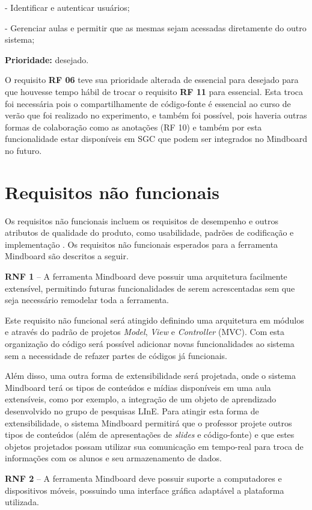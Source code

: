 - Identificar e autenticar usuários;

- Gerenciar aulas e permitir que as mesmas sejam acessadas diretamente do outro sistema;

\textbf{Prioridade:} desejado.

O requisito \textbf{RF 06} teve sua prioridade alterada de essencial para desejado para que houvesse tempo hábil de trocar o requisito \textbf{RF 11} para essencial. Esta troca foi necessária pois o compartilhamente de código-fonte é essencial ao curso de verão que foi realizado no experimento, e também foi possível, pois haveria outras formas de colaboração como as anotações (RF 10)  e também por esta funcionalidade estar disponíveis em SGC que podem ser integrados no Mindboard no futuro.

\section{Requisitos não funcionais}

Os requisitos não funcionais incluem os requisitos de desempenho e outros atributos de qualidade do produto, como usabilidade, padrões de codificação e implementação \cite{padua05}. Os requisitos não funcionais esperados para a ferramenta Mindboard são descritos a seguir.

\textbf{RNF 1} – A ferramenta Mindboard deve possuir uma arquitetura facilmente extensível, permitindo futuras funcionalidades de serem acrescentadas sem que seja necessário remodelar toda a ferramenta.

Este requisito não funcional será atingido definindo uma arquitetura em módulos e através do padrão de projetos \emph{Model}, \emph{View} e \emph{Controller} (MVC). Com esta organização do código será possível adicionar novas funcionalidades ao sistema sem a necessidade de refazer partes de códigos já funcionais.

Além disso, uma outra forma de extensibilidade será projetada, onde o sistema Mindboard terá os tipos de conteúdos e mídias disponíveis em uma aula extensíveis, como por exemplo, a integração de um objeto de aprendizado desenvolvido no grupo de pesquisas LInE. Para atingir esta forma de extensibilidade, o sistema Mindboard permitirá que o professor projete outros tipos de conteúdos (além de apresentações de \emph{slides} e código-fonte) e que estes objetos projetados possam utilizar sua comunicação em tempo-real para troca de informações com os alunos e seu armazenamento de dados.  


\textbf{RNF 2} – A ferramenta Mindboard deve possuir suporte a computadores e dispositivos móveis, possuindo uma interface gráfica adaptável a plataforma utilizada.

